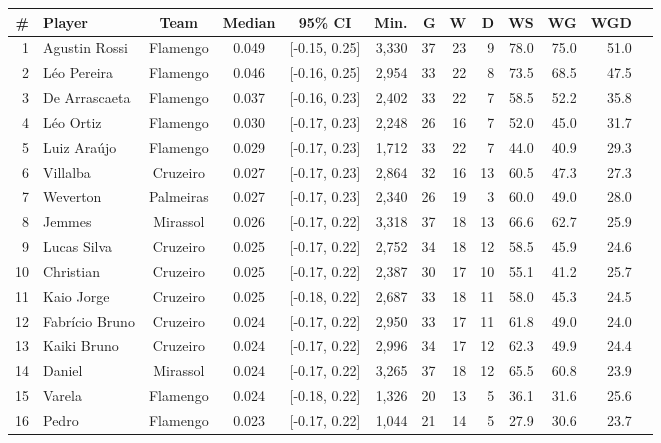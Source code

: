 \begin{table}[htbp]
    \centering
    \tiny
    \begin{tabular}{rlcccrrrrrrrr}
        \toprule
        \# & Player & Team & Median & 95\% CI & Min. & G & W & D & WS & WG & WGD \\
        \midrule
        1 & Agustin Rossi & Flamengo & 0.049 & [-0.15, 0.25] & 3,330 & 37 & 23 & 9 & 78.0 & 75.0 & 51.0 \\
        2 & Léo Pereira & Flamengo & 0.046 & [-0.16, 0.25] & 2,954 & 33 & 22 & 8 & 73.5 & 68.5 & 47.5 \\
        3 & De Arrascaeta & Flamengo & 0.037 & [-0.16, 0.23] & 2,402 & 33 & 22 & 7 & 58.5 & 52.2 & 35.8 \\
        4 & Léo Ortiz & Flamengo & 0.030 & [-0.17, 0.23] & 2,248 & 26 & 16 & 7 & 52.0 & 45.0 & 31.7 \\
        5 & Luiz Araújo & Flamengo & 0.029 & [-0.17, 0.23] & 1,712 & 33 & 22 & 7 & 44.0 & 40.9 & 29.3 \\
        6 & Villalba & Cruzeiro & 0.027 & [-0.17, 0.23] & 2,864 & 32 & 16 & 13 & 60.5 & 47.3 & 27.3 \\
        7 & Weverton & Palmeiras & 0.027 & [-0.17, 0.23] & 2,340 & 26 & 19 & 3 & 60.0 & 49.0 & 28.0 \\
        8 & Jemmes & Mirassol & 0.026 & [-0.17, 0.22] & 3,318 & 37 & 18 & 13 & 66.6 & 62.7 & 25.9 \\
        9 & Lucas Silva & Cruzeiro & 0.025 & [-0.17, 0.22] & 2,752 & 34 & 18 & 12 & 58.5 & 45.9 & 24.6 \\
        10 & Christian & Cruzeiro & 0.025 & [-0.17, 0.22] & 2,387 & 30 & 17 & 10 & 55.1 & 41.2 & 25.7 \\
        11 & Kaio Jorge & Cruzeiro & 0.025 & [-0.18, 0.22] & 2,687 & 33 & 18 & 11 & 58.0 & 45.3 & 24.5 \\
        12 & Fabrício Bruno & Cruzeiro & 0.024 & [-0.17, 0.22] & 2,950 & 33 & 17 & 11 & 61.8 & 49.0 & 24.0 \\
        13 & Kaiki Bruno & Cruzeiro & 0.024 & [-0.17, 0.22] & 2,996 & 34 & 17 & 12 & 62.3 & 49.9 & 24.4 \\
        14 & Daniel & Mirassol & 0.024 & [-0.17, 0.22] & 3,265 & 37 & 18 & 12 & 65.5 & 60.8 & 23.9 \\
        15 & Varela & Flamengo & 0.024 & [-0.18, 0.22] & 1,326 & 20 & 13 & 5 & 36.1 & 31.6 & 25.6 \\
        16 & Pedro & Flamengo & 0.023 & [-0.17, 0.22] & 1,044 & 21 & 14 & 5 & 27.9 & 30.6 & 23.7 \\

\end{tabular}
\end{table}
